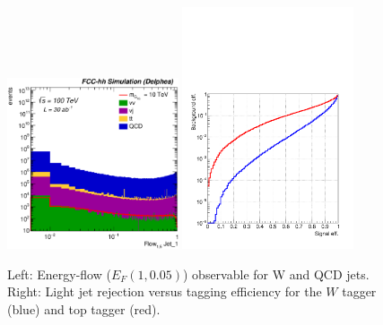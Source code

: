 \documentclass[a4paper,11pt]{article}
\begin{document}
\begin{figure}[!htbp]\centering
\includegraphics[width=0.45\textwidth]{Fig/TMVA/Jet1_Flow15_sel0_nostack_logx.eps}
\includegraphics[width=0.45\textwidth,trim={0 0.5cm 0 0},clip]{Fig/TMVA/effQCD_vs_effWhadBlue_thadRed_log.pdf}
\caption{Left: Energy-flow ($E_{F}(1,0.05)$) observable for W and QCD jets. Right: Light jet rejection versus tagging efficiency for the $W$ tagger (blue) and top tagger (red).}
\label{fig:TMVA_final_result}
\end{figure}


\end{document}
